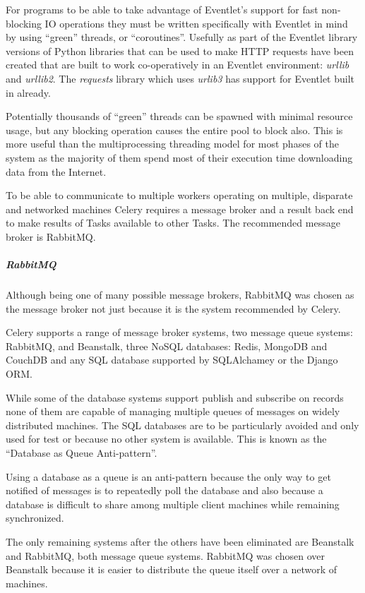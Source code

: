 For programs to be able to take advantage of Eventlet's support for fast non-blocking IO operations they must be written specifically with Eventlet in mind by using ``green'' threads, or ``coroutines''.  Usefully as part of the Eventlet library versions of Python libraries that can be used to make HTTP requests have been created that are built to work co-operatively in an Eventlet environment: \emph{urllib} and \emph{urllib2}. The \emph{requests} library which uses \emph{urlib3} has support for Eventlet built in already.

Potentially thousands of ``green'' threads can be spawned with minimal resource usage, but any blocking operation causes the entire pool to block also. This is more useful than the multiprocessing threading model for most phases of the system as the majority of them spend most of their execution time downloading data from the Internet.

To be able to communicate to multiple workers operating on multiple, disparate and networked machines Celery requires a message broker and a result back end to make results of Tasks available to other Tasks.  The recommended message broker is RabbitMQ.

\subparagraph{RabbitMQ}
Although being one of many possible message brokers, RabbitMQ was chosen as the message broker not just because it is the system recommended by Celery.

Celery supports a range of message broker systems, two message queue systems: RabbitMQ, and Beanstalk, three NoSQL databases: Redis, MongoDB and CouchDB and any SQL database supported by SQLAlchamey or the Django ORM.

While some of the database systems support publish and subscribe on records none of them are capable of managing multiple queues of messages on widely distributed machines.  The SQL databases are to be particularly avoided and only used for test or because no other system is available. This is known as the ``Database as Queue Anti-pattern''\cite{database-as-mq}.

Using a database as a queue is an anti-pattern because the only way to get notified of messages is to repeatedly poll the database and also because a database is difficult to share among multiple client machines while remaining synchronized.

The only remaining systems after the others have been eliminated are Beanstalk and RabbitMQ, both message queue systems. RabbitMQ was chosen over Beanstalk because it is easier to distribute the queue itself over a network of machines.

